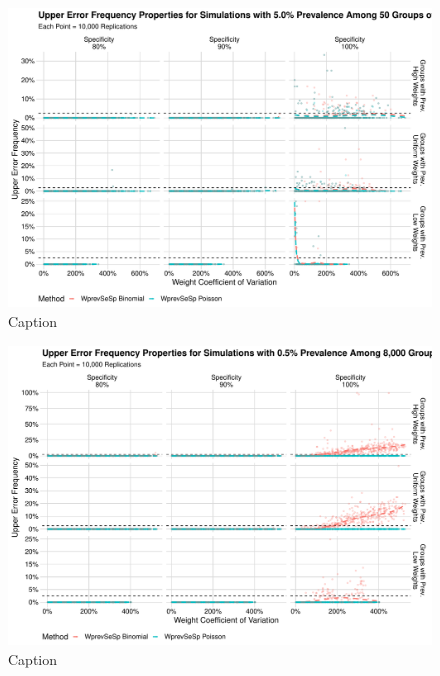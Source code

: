 \documentclass[AMA,STIX1COL]{WileyNJD-v2}
\begin{document}
\begin{figure}
    \centering
    \includegraphics[width=\textwidth]{figures/imperfect_upper_error_frequency_50_0_05_reduced.pdf}
    \caption{Caption}
    \label{fig:imperfect_upper_error_frequency_50_0_05_reduced}
\end{figure}


\begin{figure}
    \centering
    \includegraphics[width=\textwidth]{figures/imperfect_upper_error_frequency_8000_0_005_reduced.pdf}
    \caption{Caption}
    \label{fig:imperfect_upper_error_frequency_8000_0_005_reduced}
\end{figure}
\end{document}

